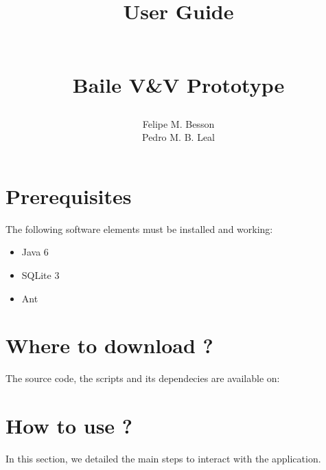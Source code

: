 \documentclass{article}	%
\author{Felipe M. Besson \\ Pedro M. B. Leal}
\title{\begin{huge}\textbf{User Guide}\end{huge} \\ Baile V\&V Prototype}
\begin{document}
\maketitle			%

\date 


\newpage

\section{ Prerequisites}
The following software elements must be installed and working:

\begin{itemize}
 \item Java 6~\cite{java6}
 \item SQLite 3~\cite{sql3}
 \item Ant~\cite{ant}
\end{itemize}

\section{ Where to download ? }
The source code, the scripts and its dependecies are available on:

\section{ How to use ? }
In this section, we detailed the main steps to interact with the application.
\end{document}
